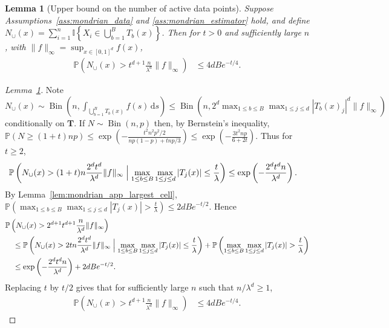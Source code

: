 \documentclass[11pt,lof]{puthesis}
\renewcommand{\P}{\ensuremath{\mathbb{P}}}
\newcommand{\I}{\ensuremath{\mathbb{I}}}
\newcommand{\bT}{\ensuremath{\mathbf{T}}}
\DeclareMathOperator{\Bin}{Bin}
\newcommand{\diff}[1]{\,\mathrm{d}#1}
\theoremstyle{break}
\newtheorem{lemma}{Lemma}[section]
\theoremstyle{proof}
\newtheorem{proof}{Proof}
\begin{document}
\begin{lemma}[Upper bound on the number of active data points]%
  \label{lem:mondrian_app_active_data}
  Suppose Assumptions~\ref{ass:mondrian_data} and \ref{ass:mondrian_estimator}
  hold,
  and define
  $N_{\cup}(x) =
  \sum_{i=1}^{n} \I \left\{ X_i \in \bigcup_{b=1}^{B} T_b(x) \right\}$.
  Then for $t > 0$ and sufficiently large $n$,
  with $\|f\|_\infty = \sup_{x \in [0,1]^d} f(x)$,
  \begin{align*}
    \P \left( N_{\cup}(x) > t^{d+1}
      \frac{n}{\lambda^d}
      \|f\|_\infty
    \right)
    &\leq
    4 d B e^{-t/4}.
  \end{align*}
\end{lemma}

\begin{proof}[Lemma~\ref{lem:mondrian_app_active_data}]

  Note $N_\cup(x) \sim
  \Bin\left(n, \int_{\bigcup_{b=1}^{B} T_b(x)} f(s) \diff s \right)
  \leq \Bin\left(n, 2^d \max_{1 \leq b \leq B} \max_{1 \leq j \leq d}
  |T_b(x)_j|^d \|f\|_\infty \right)$
  conditionally on $\bT$.
  If $N \sim \Bin(n,p)$ then, by Bernstein's inequality,
  $\P\left( N \geq (1 + t) n p\right)
  \leq \exp\left(-\frac{t^2 n^2 p^2 / 2}{n p(1-p) + t n p / 3}\right)
  \leq \exp\left(-\frac{3t^2 n p}{6 + 2t}\right)$.
  Thus for $t \geq 2$,
  \begin{align*}
    \P \left( N_{\cup}(x) > (1+t) n \frac{2^d t^d}{\lambda^d}
      \|f\|_\infty
      \Bigm| \max_{1 \leq b \leq B} \max_{1 \leq j \leq d}
      |T_j(x)| \leq \frac{t}{\lambda}
    \right)
    &\leq
    \exp\left(- \frac{2^d t^{d} n}{\lambda^d}\right).
  \end{align*}
  By Lemma~\ref{lem:mondrian_app_largest_cell},
  $\P \left( \max_{1 \leq b \leq B} \max_{1 \leq j \leq d}
  |T_j(x)| > \frac{t}{\lambda} \right)
  \leq 2 d B e^{-t/2}$.
  Hence
  \begin{align*}
    &\P \left( N_{\cup}(x) > 2^{d+1} t^{d+1} \frac{n}{\lambda^d}
      \|f\|_\infty
    \right) \\
    &\quad\leq
    \P \left( N_{\cup}(x) > 2 t n \frac{2^d t^d}{\lambda^d}
      \|f\|_\infty
      \Bigm| \max_{1 \leq b \leq B} \max_{1 \leq j \leq d}
      |T_j(x)| \leq \frac{t}{\lambda}
    \right)
    + \P \left( \max_{1 \leq b \leq B} \max_{1 \leq j \leq d}
      |T_j(x)| > \frac{t}{\lambda}
    \right) \\
    &\quad\leq
    \exp\left(- \frac{2^d t^{d} n}{\lambda^d}\right)
    + 2 d B e^{-t/2}.
  \end{align*}
  Replacing $t$ by $t/2$ gives that for sufficiently large $n$ such that
  $n / \lambda^d \geq 1$,
  \begin{align*}
    \P \left( N_{\cup}(x) > t^{d+1}
      \frac{n}{\lambda^d}
      \|f\|_\infty
    \right)
    &\leq
    4 d B e^{-t/4}.
  \end{align*}
\end{proof}
\end{document}
